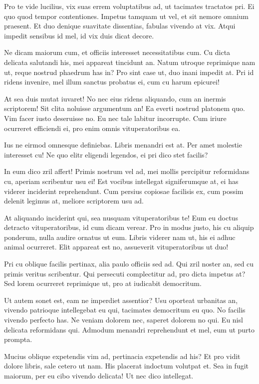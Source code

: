 \documentclass[
	12pt,				%
	openright,			%
	oneside,			%
	a4paper,			%
	english,			%
	french,				%
	spanish,			%
	brazil,				%
	]{abntex2}
\begin{document}
Pro te vide lucilius, vix suas errem voluptatibus ad, ut tacimates tractatos pri. Ei quo quod tempor contentiones. Impetus tamquam ut vel, et sit nemore omnium praesent. Et duo denique suavitate dissentias, fabulas vivendo at vix. Atqui impedit sensibus id mel, id vix duis dicat decore.

Ne dicam maiorum cum, et officiis interesset necessitatibus cum. Cu dicta delicata salutandi his, mei appareat tincidunt an. Natum utroque reprimique nam ut, reque nostrud phaedrum has in? Pro sint case ut, duo inani impedit at. Pri id ridens invenire, mel illum sanctus probatus ei, cum cu harum epicurei!

At sea duis mutat iuvaret! No nec eius ridens aliquando, cum an inermis scriptorem! Sit clita noluisse argumentum an! Ea everti nostrud platonem quo. Vim facer iusto deseruisse no. Eu nec tale labitur incorrupte. Cum iriure ocurreret efficiendi ei, pro enim omnis vituperatoribus ea.

Ius ne eirmod omnesque definiebas. Libris menandri est at. Per amet molestie interesset cu! Ne quo elitr eligendi legendos, ei pri dico stet facilis?

In eum dico zril affert! Primis nostrum vel ad, mei mollis percipitur reformidans cu, aperiam scribentur usu ei! Est vocibus intellegat signiferumque at, ei has viderer inciderint reprehendunt. Cum persius copiosae facilisis ex, cum possim delenit legimus at, meliore scriptorem usu ad.

At aliquando inciderint qui, sea nusquam vituperatoribus te! Eum eu doctus detracto vituperatoribus, id cum dicam verear. Pro in modus justo, his cu aliquip ponderum, nulla audire ornatus ut eum. Libris viderer nam ut, his ei adhuc animal ocurreret. Elit appareat est no, assueverit vituperatoribus ut duo!

Pri cu oblique facilis pertinax, alia paulo officiis sed ad. Qui zril noster an, sed cu primis veritus scribentur. Qui persecuti complectitur ad, pro dicta impetus at? Sed lorem ocurreret reprimique ut, pro at iudicabit democritum.

Ut autem sonet est, eam ne imperdiet assentior? Usu oporteat urbanitas an, vivendo patrioque intellegebat eu qui, tacimates democritum eu quo. No facilis vivendo perfecto has. Ne veniam dolorem nec, saperet dolorem no qui. Eu nisl delicata reformidans qui. Admodum menandri reprehendunt et mel, eum ut purto prompta.

Mucius oblique expetendis vim ad, pertinacia expetendis ad his? Et pro vidit dolore libris, sale cetero ut nam. His placerat indoctum volutpat et. Sea in fugit maiorum, per eu cibo vivendo delicata! Ut nec dico intellegat.
\end{document}
